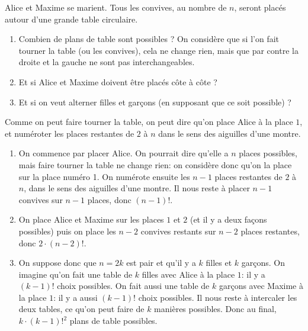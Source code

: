 \begin{exo}
Alice et Maxime se marient. Tous les convives, au nombre de $n$, seront placés autour d'une grande table circulaire.
\begin{enumerate}
\item Combien de plans de table sont possibles ? On considère que si l'on fait tourner la table (ou les convives), cela ne change rien, mais que par contre la droite et la gauche ne sont pas interchangeables. 
\item Et si Alice et Maxime doivent être placés côte à côte ?
\item Et si on veut alterner filles et garçons (en supposant que  ce soit possible) ?
\end{enumerate}

\begin{hint} %
Comme on peut faire tourner la table, on peut dire qu'on place Alice à la place $1$, et numéroter les places restantes de $2$ à $n$ dans le sens des aiguilles d'une montre. 
\end{hint}

\begin{sol} %
\begin{enumerate}
\item On commence par placer Alice. On pourrait dire qu'elle a $n$ places possibles, mais faire tourner la table ne change rien: on considère donc qu'on la place sur la place numéro 1. On numérote ensuite les $n-1$ places restantes de $2$ à $n$, dans le sens des aiguilles d'une montre. Il nous reste à placer $n-1$ convives sur $n-1$ places, donc $(n-1)!$.
\item On place Alice et Maxime sur les places $1$ et $2$ (et il y a deux façons possibles) puis on place les $n-2$ convives restants sur $n-2$ places restantes, donc $2 \cdot (n-2)!$.
\item On suppose donc que $n=2k$ est pair et qu'il y a $k$ filles et $k$ garçons. On imagine qu'on fait une table de $k$ filles avec Alice à la place $1$: il y a $(k-1)!$ choix possibles. On fait aussi une table de $k$ garçons avec Maxime à la place $1$: il y a aussi $(k-1)!$ choix possibles. Il nous reste à intercaler les deux tables, ce qu'on peut faire de $k$ manières possibles. Donc au final, $k\cdot (k-1)!^2$ plans de table possibles.
\end{enumerate}
\end{sol}
\end{exo}

